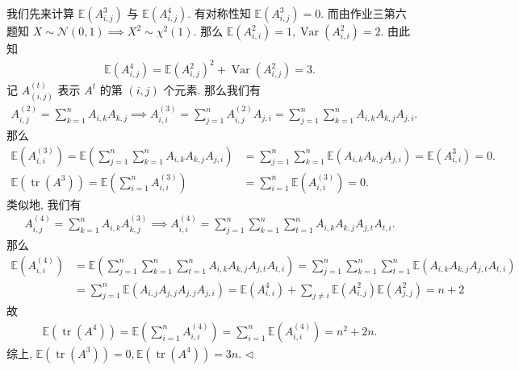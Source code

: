 \documentclass[11pt]{article}
\newenvironment{answer}[1][Solution]{\begin{trivlist}
    \item[\hskip \labelsep {\bfseries #1.}\hskip \labelsep]}{\hfill$\lhd$\end{trivlist}}
\newcommand\1{\mathds{1}}
\newcommand\E{\mathbb{E}}
\DeclareMathOperator{\tr}{tr}
\DeclareMathOperator{\Var}{Var}
\begin{document}
\begin{answer}
    我们先来计算 $\E(A_{i,j}^3)$ 与 $\E(A_{i,j}^4)$. 有对称性知 $\E(A_{i,j}^3) = 0$. 而由作业三第六题知 $X\sim \mathcal{N}(0,1) \implies X^2 \sim \chi^2(1)$. 那么
    $\E(A_{i,i}^2) = 1, \Var(A_{i,i}^2) = 2$. 由此知 
    \begin{align*}
        \E(A_{i,j}^4) = \E(A_{i,j}^2)^2 + \Var(A_{i,j}^2) = 3.
    \end{align*} 
    记 $A^{(t)}_{(i,j)}$ 表示 $A^t$ 的第 $(i,j)$ 个元素. 那么我们有
    \begin{align*}
        A^{(2)}_{i,j} = \sum_{k=1}^{n} A_{i,k}A_{k,j} \implies A^{(3)}_{i,i} = \sum_{j=1}^{n} A^{(2)}_{i,j}A_{j,i} = \sum_{j=1}^{n} \sum_{k=1}^{n} A_{i,k}A_{k,j}A_{j,i}.
    \end{align*}
    那么
    \begin{align*}
        \E(A^{(3)}_{i,i}) = \E\left(\sum_{j=1}^{n} \sum_{k=1}^{n} A_{i,k}A_{k,j}A_{j,i}\right) &= \sum_{j=1}^{n} \sum_{k=1}^{n} \E(A_{i,k}A_{k,j}A_{j,i}) = \E(A_{i,i}^3) = 0. \\
        \E(\tr(A^3)) = \E\left(\sum_{i=1}^{n} A^{(3)}_{i,i}\right) &= \sum_{i=1}^{n} \E\left(A^{(3)}_{i,i}\right) = 0.
    \end{align*}
    类似地, 我们有
    \begin{align*}
        A^{(4)}_{i,j} = \sum_{k=1}^{n} A_{i,k}A^{(3)}_{k,j} \implies A^{(4)}_{i,i} = \sum_{j=1}^{n} \sum_{k=1}^{n} \sum_{t=1}^{n} A_{i,k}A_{k,j}A_{j,t}A_{t,i}.
    \end{align*}
    那么
    \begin{align*}
        \E(A^{(4)}_{i,i}) &= \E\left(\sum_{j=1}^{n} \sum_{k=1}^{n} \sum_{t=1}^{n} A_{i,k}A_{k,j}A_{j,t}A_{t,i}\right) = \sum_{j=1}^{n} \sum_{k=1}^{n} \sum_{t=1}^{n} \E(A_{i,k}A_{k,j}A_{j,t}A_{t,i}) \\
        &= \sum_{j=1}^{n} \E(A_{i,j}A_{j,j}A_{j,j}A_{j,i}) = \E(A_{i,i}^4) + \sum_{j\neq i} \E(A_{i,j}^2) \E(A_{j,j}^2) = n + 2
    \end{align*}
    故
    \begin{align*}
        \E(\tr(A^4)) = \E\left(\sum_{i=1}^{n} A^{(4)}_{i,i}\right) = \sum_{i=1}^{n} \E\left(A^{(4)}_{i,i}\right) = n^2 + 2n.
    \end{align*}
    综上, $\E(\tr(A^3)) = 0, \E(\tr(A^4)) = 3n$.
\end{answer}
\end{document}
